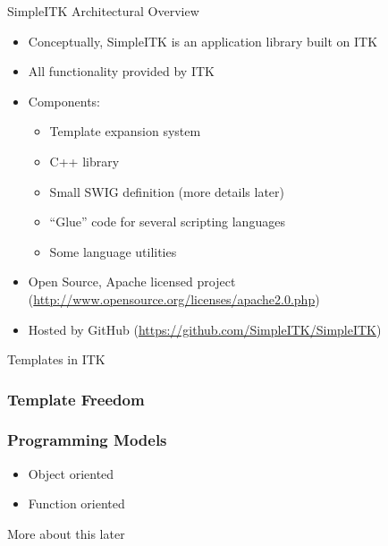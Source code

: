 \begin{frame}{SimpleITK Architectural Overview}
\begin{itemize}
\item Conceptually, SimpleITK is an application library built on ITK
\item All functionality provided by ITK
\item Components:
  \begin{itemize}
    \item Template expansion system
    \item C++ library
    \item Small SWIG definition (more details later)
    \item ``Glue'' code for several scripting languages
    \item Some language utilities
  \end{itemize}
\item Open Source, Apache licensed project (\url{http://www.opensource.org/licenses/apache2.0.php})
\item Hosted by GitHub (\url{https://github.com/SimpleITK/SimpleITK})
\end{itemize}
\end{frame}

\begin{frame}{Templates in ITK}
\begin{center}
\lstcpp

\end{center}
\end{frame}

\begin{frame}
\frametitle{Template Freedom}
\begin{center}
\lstcpp

\end{center}
\end{frame}

\begin{frame}
\frametitle{Programming Models}
\begin{itemize}
\item Object oriented
\item Function oriented
\end{itemize}
More about this later
\end{frame}

